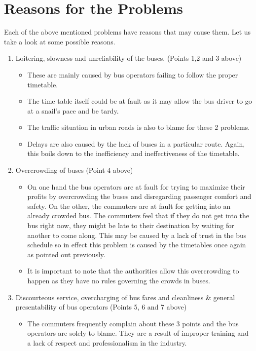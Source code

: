 \section{Reasons for the Problems}
Each of the above mentioned problems have reasons that may cause them. Let us take a look at some possible reasons.
\begin {enumerate}
\item Loitering, slowness and unreliability of the buses. (Points 1,2 and 3 above)
\begin {itemize}
\item These are mainly caused by bus operators failing to follow the proper timetable.
\item The time table itself could be at fault as it may allow the bus driver to go at a snail’s pace and be tardy.
\item The traffic situation in urban roads is also to blame for these 2 problems.
\item Delays are also caused by the lack of buses in a particular route. Again, this boils down to the inefficiency and ineffectiveness of the timetable.
\end {itemize}
\item Overcrowding of buses (Point 4 above)
\begin {itemize}
\item On one hand the bus operators are at fault for trying to maximize their profits by overcrowding the buses and disregarding passenger comfort and safety. On the other, the commuters are at fault for getting into an already crowded bus. The commuters feel that if they do not get into the bus right now, they might be late to their destination by waiting for another to come along. This may be caused by a lack of trust in the bus schedule so in effect this problem is caused by the timetables once again as pointed out previously.
\item It is important to note that the authorities allow this overcrowding to happen as they have no rules governing the crowds in buses.
\end {itemize}
\item Discourteous service, overcharging of bus fares and cleanliness \& general presentability of bus operators (Points 5, 6 and 7 above)
\begin {itemize}
\item The commuters frequently complain about these 3 points and the bus operators are solely to blame. They are a result of improper training and a lack of respect and professionalism in the industry.

\end{itemize}
\end{enumerate}
